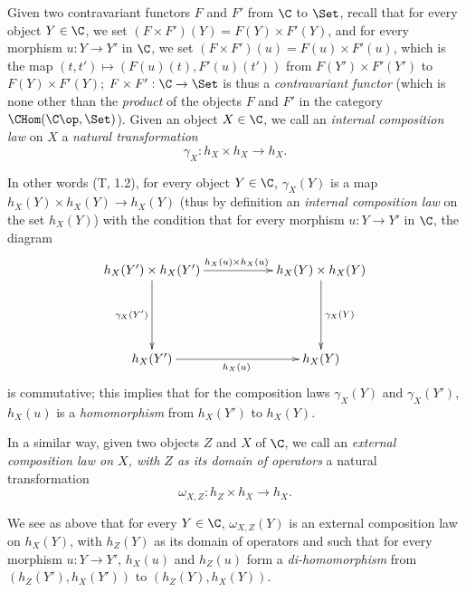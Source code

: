 \begin{env}[8.2.1]
\label{0.8.2.1}
Given two contravariant functors $F$ and $F'$ from $\C$ to $\Set$, recall that for every object $Y\in\C$, we set $(F\times F')(Y)=F(Y)\times F'(Y)$, and for every morphism $u:Y\to Y'$ in $\C$, we set $(F\times F')(u)=F(u)\times F'(u)$, which is the map $(t,t')\mapsto(F(u)(t),F'(u)(t'))$ from $F(Y')\times F'(Y')$ to $F(Y)\times F'(Y)$; $F\times F':\C\to\Set$ is thus a \emph{contravariant functor} (which is none other than the \emph{product} of the objects $F$ and $F'$ in the category $\CHom(\C\op,\Set)$).
Given an object $X\in\C$, we call an \emph{internal composition law} on $X$ a \emph{natural transformation}
\[
\label{0.8.2.1.1}
  \gamma_X:h_X\times h_X\to h_X.
  \tag{8.2.1.1}
\]

In other words (T, 1.2), for every object $Y\in\C$, $\gamma_X(Y)$ is a map $h_X(Y)\times h_X(Y)\to h_X(Y)$ (thus by definition an \emph{internal composition law} on the set $h_X(Y)$) with the condition that for every morphism $u:Y\to Y'$ in $\C$, the diagram
\[
  \xymatrix{
    h_X(Y')\times h_X(Y')\ar[rr]^{h_X(u)\times h_X(u)}\ar[dd]_{\gamma_X(Y')} & &
    h_X(Y)\times h_X(Y)\ar[dd]^{\gamma_X(Y)}\\\\
    h_X(Y')\ar[rr]_{h_X(u)} & &
    h_X(Y)
  }
\]
is commutative; this implies that for the composition laws $\gamma_X(Y)$ and $\gamma_X(Y')$, $h_X(u)$ is a \emph{homomorphism} from $h_X(Y')$ to $h_X(Y)$.

In a similar way, given two objects $Z$ and $X$ of $\C$, we call an \emph{external composition law on $X$, with $Z$ as its domain of operators} a natural transformation
\[
\label{0.8.2.1.2}
  \omega_{X,Z}:h_Z\times h_X\to h_X.
  \tag{8.2.1.2}
\]

We see as above that for every $Y\in\C$, $\omega_{X,Z}(Y)$ is an external composition law on $h_X(Y)$, with $h_Z(Y)$ as its domain of operators and such that for every morphism $u:Y\to Y'$, $h_X(u)$ and $h_Z(u)$ form a \emph{di-homomorphism} from $(h_Z(Y'),h_X(Y'))$ to $(h_Z(Y),h_X(Y))$.
\end{env}

